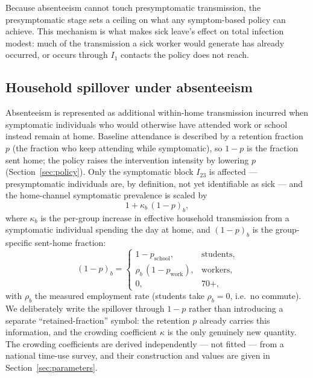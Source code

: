 \documentclass[12pt]{article}
\theoremstyle{plain}
\theoremstyle{remark}
\theoremstyle{definition}
\begin{document}
Because absenteeism cannot touch presymptomatic transmission, the presymptomatic stage sets a ceiling on what any symptom-based policy can achieve. This mechanism is what makes sick leave's effect on total infection modest: much of the transmission a sick worker would generate has already occurred, or occurs through $I_1$ contacts the policy does not reach.

\subsection{Household spillover under absenteeism}
\label{sec:spillover}
Absenteeism is represented as additional within-home transmission incurred when symptomatic individuals who would otherwise have attended work or school instead remain at home. Baseline attendance is described by a retention fraction $p$ (the fraction who keep attending while symptomatic), so $1-p$ is the fraction sent home; the policy raises the intervention intensity by lowering $p$ (Section~\ref{sec:policy}). Only the symptomatic block $I_{23}$ is affected --- presymptomatic individuals are, by definition, not yet identifiable as sick --- and the home-channel symptomatic prevalence is scaled by
\begin{equation}
1 + \kappa_b\,(1-p)_b ,
\end{equation}
where $\kappa_b$ is the per-group increase in effective household transmission from a symptomatic individual spending the day at home, and $(1-p)_b$ is the group-specific sent-home fraction:
\begin{equation}
(1-p)_b =
\begin{cases}
1 - p_{\mathrm{school}}, & \text{students},\\
\rho_b\,(1 - p_{\mathrm{work}}), & \text{workers},\\
0, & 70+,
\end{cases}
\end{equation}
with $\rho_b$ the measured employment rate (students take $\rho_b = 0$, i.e.\ no commute). We deliberately write the spillover through $1-p$ rather than introducing a separate ``retained-fraction'' symbol: the retention $p$ already carries this information, and the crowding coefficient $\kappa$ is the only genuinely new quantity. The crowding coefficients are derived independently --- not fitted --- from a national time-use survey, and their construction and values are given in Section~\ref{sec:parameters}.
\end{document}
